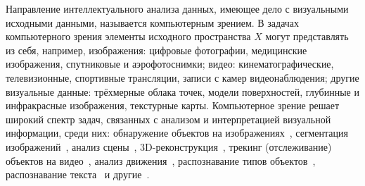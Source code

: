 Направление интеллектуального анализа данных, имеющее дело с визуальными исходными данными, называется компьютерным зрением. В задачах компьютерного зрения элементы исходного пространства $X$ могут представлять из себя, например, изображения: цифровые фотографии, медицинские изображения, спутниковые и аэрофотоснимки; видео: кинематографические, телевизионные, спортивные трансляции, записи с камер видеонаблюдения; другие визуальные данные: трёхмерные облака точек, модели поверхностей, глубинные и инфракрасные изображения, текстурные карты. Компьютерное зрение решает широкий спектр задач, связанных с анализом и интерпретацией визуальной информации, среди них: обнаружение объектов на изображениях~\cite{chen, kaur, liul, xiao}, сегментация изображений~\cite{csurka, soylu, wangy, mittal, jiangb}, анализ сцены~\cite{wangx, valipoor, fan}, 3D-реконструкция~\cite{zhoul, samavati, hanxf, ham}, трекинг (отслеживание) объектов на видео~\cite{hassan, kadam, dong}, анализ движения~\cite{kaushik, hesse, colyer}, распознавание типов объектов~\cite{khalil, chatterjee, krizhevsky}, распознавание текста~\cite{moudgil, ranjan, islam} и другие~\cite{davies, prince, szeliski, jain}.





